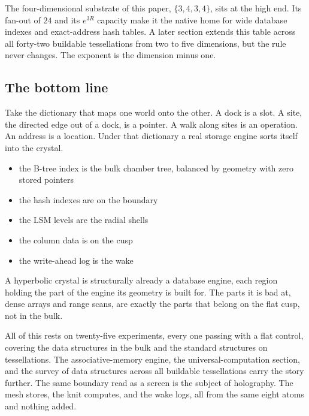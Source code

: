 The four-dimensional substrate of this paper, $\{3,4,3,4\}$, sits at the high end. Its fan-out of $24$ and its $e^{3R}$ capacity make it the native home for wide database indexes and exact-address hash tables. A later section extends this table across all forty-two buildable tessellations from two to five dimensions, but the rule never changes. The exponent is the dimension minus one.

\subsection{The bottom line}

Take the dictionary that maps one world onto the other. A dock is a slot. A site, the directed edge out of a dock, is a pointer. A walk along sites is an operation. An address is a location. Under that dictionary a real storage engine sorts itself into the crystal.

\begin{itemize}
\item the B-tree index is the bulk chamber tree, balanced by geometry with zero stored pointers
\item the hash indexes are on the boundary
\item the LSM levels are the radial shells
\item the column data is on the cusp
\item the write-ahead log is the wake
\end{itemize}

\begin{result}
A hyperbolic crystal is structurally already a database engine, each region holding the part of the engine its geometry is built for. The parts it is bad at, dense arrays and range scans, are exactly the parts that belong on the flat cusp, not in the bulk.
\end{result}

All of this rests on twenty-five experiments, every one passing with a flat control, covering the data structures in the bulk and the standard structures on tessellations. The associative-memory engine, the universal-computation section, and the survey of data structures across all buildable tessellations carry the story further. The same boundary read as a screen is the subject of holography. The mesh stores, the knit computes, and the wake logs, all from the same eight atoms and nothing added.

